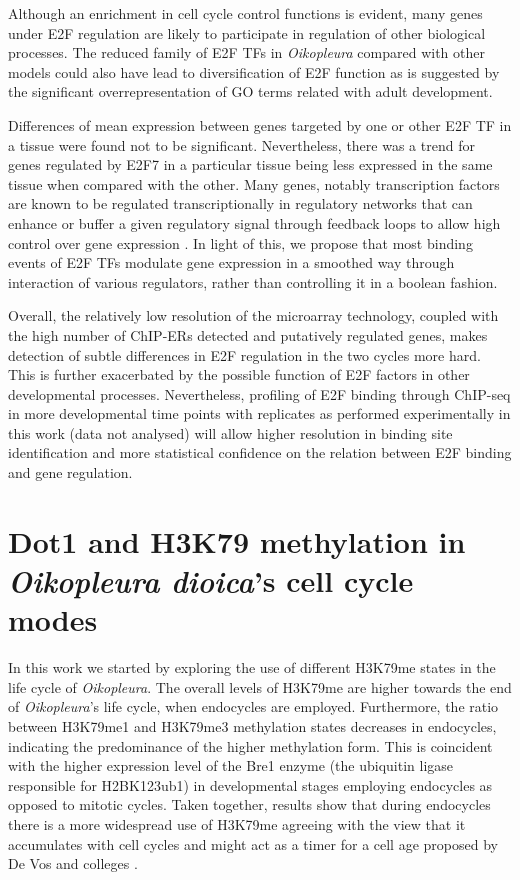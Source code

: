 \documentclass[11pt,twoside,a4paper]{report}
\begin{document}
Although an enrichment in cell cycle control functions is evident, many genes under E2F regulation are likely to participate in regulation of other biological processes. The reduced family of E2F TFs in \textit{Oikopleura} compared with other models could also have lead to diversification of E2F function as is suggested by the significant overrepresentation of GO terms related with adult development. 

Differences of mean expression between genes targeted by one or other E2F TF in a tissue were found not to be significant. Nevertheless, there was a trend for genes regulated by E2F7 in a particular tissue being less expressed in the same tissue when compared with the other. Many genes, notably transcription factors are known to be regulated transcriptionally in regulatory networks that can enhance or buffer a given regulatory signal through feedback loops to allow high control over gene expression \cite{Macneil2011}. In light of this, we propose that most binding events of E2F TFs modulate gene expression in a smoothed way through interaction of various regulators, rather than controlling it in a boolean fashion.

Overall, the relatively low resolution of the microarray technology, coupled with the high number of ChIP-ERs detected and putatively regulated genes, makes detection of subtle differences in E2F regulation in the two cycles more hard. This is further exacerbated by the possible function of E2F factors in other developmental processes. Nevertheless, profiling of E2F binding through ChIP-seq in more developmental time points with replicates as performed experimentally in this work (data not analysed) will allow higher resolution in binding site identification and more statistical confidence on the relation between E2F binding and gene regulation.

\clearpage

\section{Dot1 and H3K79 methylation in \textit{Oikopleura dioica}'s cell cycle modes}

In this work we started by exploring the use of different H3K79me states in the life cycle of \textit{Oikopleura}. The overall levels of H3K79me are higher towards the end of \textit{Oikopleura}'s life cycle, when endocycles are employed. Furthermore, the ratio between H3K79me1 and H3K79me3 methylation states decreases in endocycles, indicating the predominance of the higher methylation form. This is coincident with the higher expression level of the Bre1 enzyme (the ubiquitin ligase responsible for H2BK123ub1) in developmental stages employing endocycles as opposed to mitotic cycles. Taken together, results show that during endocycles there is a more widespread use of H3K79me agreeing with the view that it accumulates with cell cycles and might act as a timer for a cell age proposed by De Vos and colleges \cite{DeVos2011}.
\end{document}
